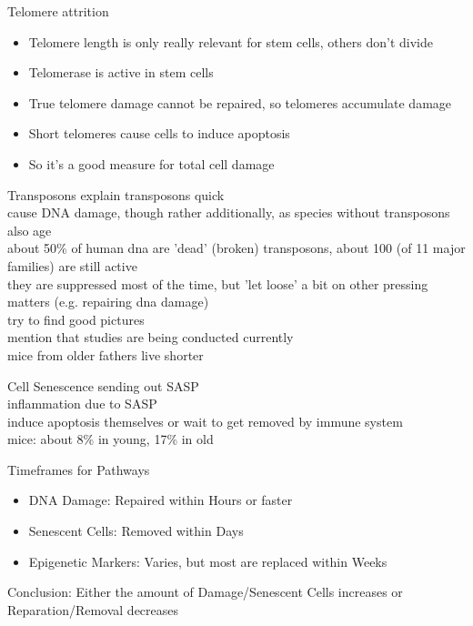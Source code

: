 \begin{frame}[c]{Telomere attrition}
    \large
    \begin{itemize}[<+(1)->]
        \item Telomere length is only really relevant for stem cells, others don't divide
        \item Telomerase is active in stem cells
        \item True telomere damage cannot be repaired, so telomeres accumulate damage \cite{NintilTh68:online}
        \item Short telomeres cause cells to induce apoptosis
        \item So it's a good measure for total cell damage \cite{victorelli2017telomeres} 
    \end{itemize}
\end{frame}

\begin{frame}[c]{Transposons}
    explain transposons quick \\
    cause DNA damage, though rather additionally, as species without transposons also age \\
    about 50\% of human dna are 'dead' (broken) transposons, about 100 (of 11 major families) are still active \\
    they are suppressed most of the time, but 'let loose' a bit on other pressing matters (e.g. repairing dna damage) \\
    try to find good pictures \\
    mention that studies are being conducted currently \\
    mice from older fathers live shorter \cite{xie2018epigenetic}

\end{frame}

\begin{frame}[c]{Cell Senescence}
    sending out SASP \\
    inflammation due to SASP \\
    induce apoptosis themselves or wait to get removed by immune system \\
    mice: about 8\% in young, 17\% in old \cite{folgueras2018mouse} \\
\end{frame}


\begin{frame}[c]{Timeframes for Pathways}
    \large
    \begin{itemize}[<+(1)->]
        \item DNA Damage: Repaired within Hours or faster \cite{frankenberg1989review}
        \item Senescent Cells: Removed within Days \cite{karin2018senescent}
        \item Epigenetic Markers: Varies, but most are replaced within Weeks \cite{ginno2020genome} \cite{yamagata2012rapid}
    \end{itemize}
    \pause
    Conclusion: Either the amount of Damage/Senescent Cells increases or Reparation/Removal decreases
\end{frame}


